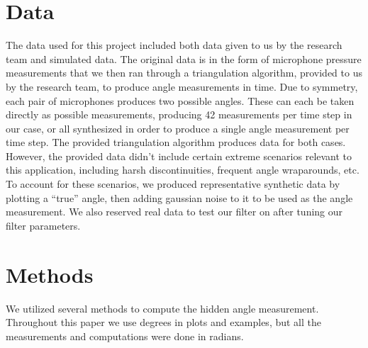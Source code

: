 \documentclass[11pt]{amsart}
\begin{document}
\section{Data}
The data used for this project included both data given to us by the research team and simulated data. The original data is in the form of microphone pressure measurements that we then ran through a triangulation algorithm, provided to us by the research team, to produce angle measurements in time. Due to symmetry, each pair of microphones produces two possible angles. These can each be taken directly as possible measurements, producing 42 measurements per time step in our case, or all synthesized in order to produce a single angle measurement per time step. The provided triangulation algorithm produces data for both cases.
However, the provided data didn’t include certain extreme scenarios relevant to this application, including harsh discontinuities, frequent angle wraparounds, etc. To account for these scenarios, we produced representative synthetic data by plotting a “true” angle, then adding gaussian noise to it to be used as the angle measurement. We also reserved real data to test our filter on after tuning our filter parameters.

\section{Methods}
We utilized several methods to compute the hidden angle measurement. Throughout this paper we use degrees in plots and examples, but all the measurements and computations were done in radians. 
\end{document}
